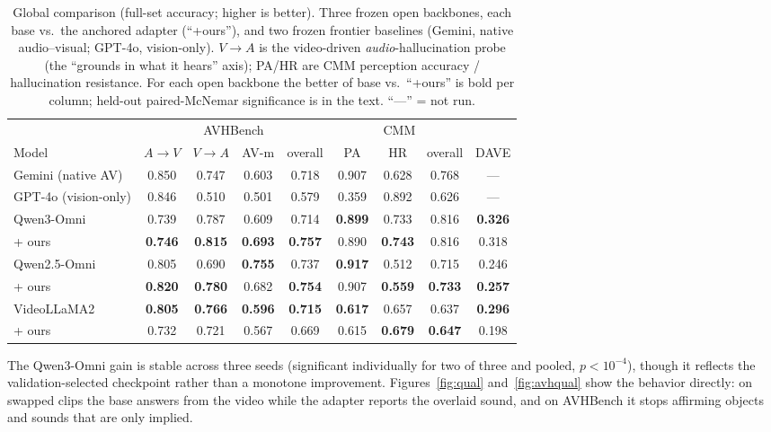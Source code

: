 \documentclass{article}
\begin{document}
\begin{table}[tb]\centering\footnotesize
\setlength{\tabcolsep}{4pt}
\caption{Global comparison (full-set accuracy; higher is better). Three frozen open backbones, each base
vs.\ the anchored adapter (``+ours''), and two frozen frontier baselines (Gemini, native audio--visual;
GPT-4o, vision-only). $V\!\to\!A$ is the video-driven \emph{audio}-hallucination probe (the ``grounds in
what it hears'' axis); PA/HR are CMM perception accuracy / hallucination resistance. For each open
backbone the better of base vs.\ ``+ours'' is bold per column; held-out paired-McNemar significance is in
the text. ``---'' = not run.}
\label{tab:main}
\begin{tabular}{l cccc ccc c}
\toprule
& \multicolumn{4}{c}{AVHBench} & \multicolumn{3}{c}{CMM} & \\
\cmidrule(lr){2-5}\cmidrule(lr){6-8}
Model & $A\!\to\!V$ & $V\!\to\!A$ & AV-m & overall & PA & HR & overall & DAVE \\
\midrule
Gemini (native AV)    & 0.850 & 0.747 & 0.603 & 0.718 & 0.907 & 0.628 & 0.768 & --- \\
GPT-4o (vision-only)  & 0.846 & 0.510 & 0.501 & 0.579 & 0.359 & 0.892 & 0.626 & --- \\
\midrule
Qwen3-Omni            & 0.739 & 0.787 & 0.609 & 0.714 & \textbf{0.899} & 0.733 & 0.816 & \textbf{0.326} \\
\quad + ours          & \textbf{0.746} & \textbf{0.815} & \textbf{0.693} & \textbf{0.757} & 0.890 & \textbf{0.743} & 0.816 & 0.318 \\
Qwen2.5-Omni          & 0.805 & 0.690 & \textbf{0.755} & 0.737 & \textbf{0.917} & 0.512 & 0.715 & 0.246 \\
\quad + ours          & \textbf{0.820} & \textbf{0.780} & 0.682 & \textbf{0.754} & 0.907 & \textbf{0.559} & \textbf{0.733} & \textbf{0.257} \\
VideoLLaMA2           & \textbf{0.805} & \textbf{0.766} & \textbf{0.596} & \textbf{0.715} & \textbf{0.617} & 0.657 & 0.637 & \textbf{0.296} \\
\quad + ours          & 0.732 & 0.721 & 0.567 & 0.669 & 0.615 & \textbf{0.679} & \textbf{0.647} & 0.198 \\
\bottomrule
\end{tabular}
\end{table}

The Qwen3-Omni gain is stable across three seeds (significant individually for two of three and pooled,
$p<10^{-4}$), though it reflects the validation-selected checkpoint rather than a monotone improvement.
Figures~\ref{fig:qual} and~\ref{fig:avhqual} show the behavior directly: on swapped clips the base answers
from the video while the adapter reports the overlaid sound, and on AVHBench it stops affirming objects and
sounds that are only implied.
\end{document}
